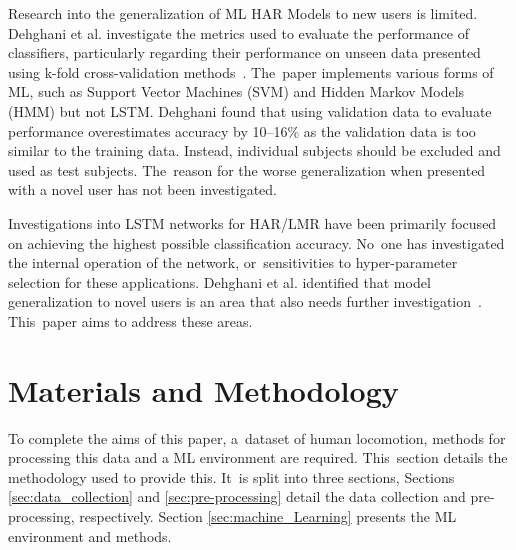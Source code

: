 Research into the generalization of ML HAR Models to new users is limited. Dehghani et al. investigate the metrics used to evaluate the performance of classifiers, particularly regarding their performance on unseen data presented using k-fold cross-validation methods~\cite{Dehghani2019}. The~paper implements various forms of ML, such as Support Vector Machines (SVM) and Hidden Markov Models (HMM) but not LSTM. Dehghani found that using validation data to evaluate performance overestimates accuracy by 10--16\% as the validation data is too similar to the training data. Instead, individual subjects should be excluded and used as test subjects. The~reason for the worse generalization when presented with a novel user has not been investigated.

Investigations into LSTM networks for HAR/LMR have been primarily focused on achieving the highest possible classification accuracy. No~one has investigated the internal operation of the network, or~sensitivities to hyper-parameter selection for these applications. Dehghani et al. identified that model generalization to novel users is an area that also needs further investigation~\cite{Dehghani2019}. This~paper aims to address these areas.

\section{Materials and Methodology}
\label{sec:materials_and_methdology}
To complete the aims of this paper, a~dataset of human locomotion, methods for processing this data and a ML environment are required. This~section details the methodology used to provide this. It~is split into three sections, Sections \ref{sec:data_collection} and \ref{sec:pre-processing} detail the data collection and pre-processing, respectively. Section \ref{sec:machine_Learning} presents the ML environment and methods.


